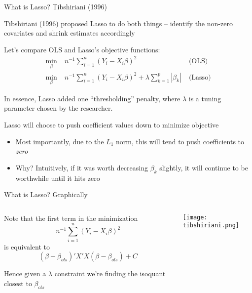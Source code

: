 \documentclass[notes,11pt, aspectratio=169]{beamer}
\newenvironment{wideitemize}{\itemize\addtolength{\itemsep}{10pt}}{\enditemize}
\begin{document}
\begin{frame}{What is Lasso? Tibshiriani (1996)}
  \begin{wideitemize}
  \item Tibshiriani (1996) proposed Lasso to do both things -- identify the
    non-zero covariates and shrink estimates accordingly
  \item Let's compare OLS and Lasso's objective functions:
        \begin{align*}
      \min_{\beta} \; & n^{-1}\sum_{i=1}^{n}(Y_{i} - X_{i}\beta)^{2}   \;& \text{(OLS)}\\
      \min_{\beta} \;& n^{-1}\sum_{i=1}^{n}(Y_{i} - X_{i}\beta)^{2} + \lambda \sum_{k=1}^{p}|\beta_{k}|   \;& \text{(Lasso)}     \end{align*}
  \item In essence, Lasso added one ``thresholding'' penalty, where
    $\lambda$ is a tuning parameter chosen by the researcher.
  \item Lasso will choose to push coefficient values down to minimize objective 
    \begin{itemize}
    \item Most importantly, due to the $L_{1}$ norm, this will tend to push coefficients to \emph{zero}
    \item Why? Intuitively, if it was worth decreasing $\beta_{k}$
      slightly, it will continue to be worthwhile until it hits zero
    \end{itemize}
  \end{wideitemize}
\end{frame}

\begin{frame}{What is Lasso? Graphically}
  \begin{columns}[T] %
    \begin{column}{.35\textwidth}
      \begin{wideitemize}
      \item Note that the first term in the  minimization
        $$n^{-1}\sum_{i=1}^{n}(Y_{i} - X_{i}\beta)^{2}$$
        is equivalent to
        $$(\beta- \beta_{ols})'X'X(\beta- \beta_{ols}) + C$$
      \item Hence given a $\lambda$ constraint we're finding the
        isoquant closest to $\beta_{ols}$
      \end{wideitemize}
    \end{column}%
  \hfill%
  \begin{column}{.65\textwidth}
    \texttt{[image: tibshiriani.png]}
  \end{column}
\end{columns}
\end{frame}
\end{document}
